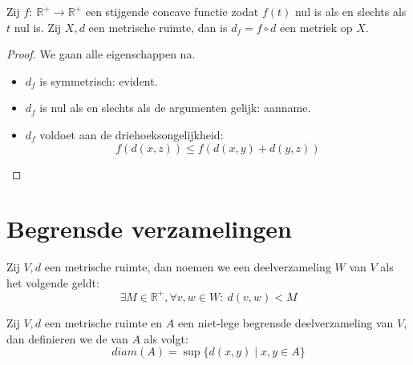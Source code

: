 \documentclass[main.tex]{subfiles}
\begin{document}
\begin{st}
  Zij $f:\ \mathbb{R}^{+} \rightarrow \mathbb{R}^{+}$ een stijgende concave functie zodat $f(t)$ nul is als en slechts als $t$ nul is.
  Zij $X,d$ een metrische ruimte, dan is $d_{f} = f\circ d$ een metriek op $X$.

  \begin{proof}
    We gaan alle eigenschappen na.
    \begin{itemize}
    \item $d_{f}$ is symmetrisch: evident.
    \item $d_{f}$ is nul als en slechts als de argumenten gelijk: aanname.
    \item $d_{f}$ voldoet aan de driehoeksongelijkheid:
      \[ f(d(x,z)) \le f(d(x,y) + d(y,z)) \]
    \end{itemize}
  \end{proof}
\end{st}


\section{Begrensde verzamelingen}
\label{sec:begr-verz}

\begin{de}
  \label{de:metrische-ruimte-begrensde-verzameling}
  Zij $V,d$ een metrische ruimte, dan noemen we een deelverzameling $W$ van $V$  als het volgende geldt:
  \[ \exists M\in \mathbb{R}^{+}, \forall v,w\in W:\ d(v,w) < M \]
\end{de}

\begin{de}
  Zij $V,d$ een metrische ruimte en $A$ een niet-lege begrensde deelverzameling van $V$, dan definieren we de  van $A$ als volgt:
  \[ diam(A) = \sup\{d(x,y) \mid x,y \in A \} \]
\end{de}
\end{document}
